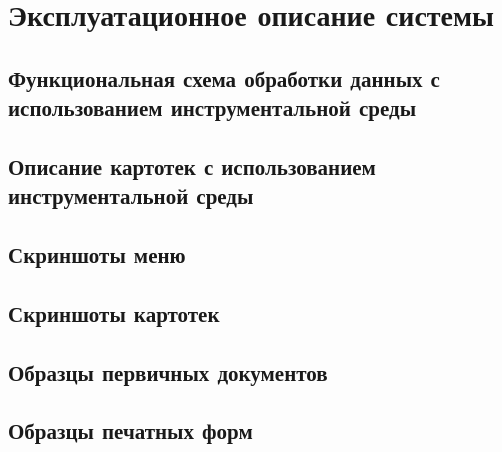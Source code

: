 \section{Эксплуатационное описание системы}

\subsection{Функциональная схема обработки данных с использованием инструментальной среды}
\subsection{Описание картотек с использованием инструментальной среды}
\subsection{Скриншоты меню}
\subsection{Скриншоты картотек}
\subsection{Образцы первичных документов}
\subsection{Образцы печатных форм}

\newpage
